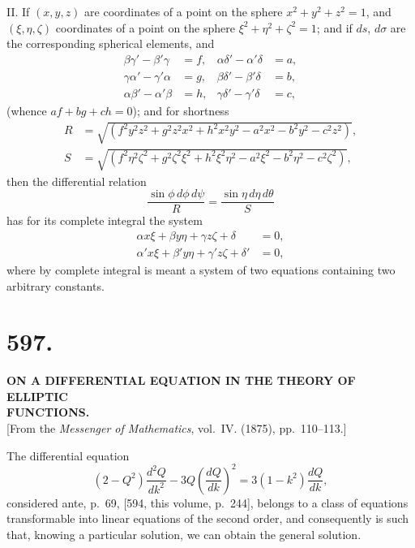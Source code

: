 \documentclass[11pt,a4paper]{book}
\begin{document}
\medskip
\noindent\textsc{II.}\quad
If $(x,y,z)$ are coordinates of a point on the sphere $x^2+y^2+z^2=1$, and
$(\xi,\eta,\zeta)$ coordinates of a point on the sphere
$\xi^2+\eta^2+\zeta^2=1$; and if $ds$, $d\sigma$ are the corresponding
spherical elements, and
\begin{align*}
\beta\gamma'-\beta'\gamma &= f, & \alpha\delta'-\alpha'\delta &= a, \\
\gamma\alpha'-\gamma'\alpha &= g, & \beta\delta'-\beta'\delta &= b, \\
\alpha\beta'-\alpha'\beta &= h, & \gamma\delta'-\gamma'\delta &= c,
\end{align*}
(whence $af+bg+ch=0$); and for shortness
\begin{align*}
R &= \sqrt{(f^2y^2z^2+g^2z^2x^2+h^2x^2y^2-a^2x^2-b^2y^2-c^2z^2)},\\
S &= \sqrt{(f^2\eta^2\zeta^2+g^2\zeta^2\xi^2+h^2\xi^2\eta^2
       -a^2\xi^2-b^2\eta^2-c^2\zeta^2)},
\end{align*}
then the differential relation
\[
\frac{\sin\phi\,d\phi\,d\psi}{R}
  = \frac{\sin\eta\,d\eta\,d\theta}{S}
\]
has for its complete integral the system
\begin{align*}
\alpha x\xi + \beta y\eta + \gamma z\zeta + \delta &= 0,\\
\alpha' x\xi + \beta' y\eta + \gamma' z\zeta + \delta' &= 0,
\end{align*}
where by complete integral is meant a system of two equations containing two
arbitrary constants.

\newpage
\section*{597.}
\begin{center}
{\large\bfseries ON A DIFFERENTIAL EQUATION IN THE THEORY OF ELLIPTIC\\
FUNCTIONS.}\\[0.5em]
[From the \textit{Messenger of Mathematics}, vol.~IV. (1875), pp.~110--113.]
\end{center}

The differential equation
\[
(2-Q^2)\frac{d^2Q}{dk^2} - 3Q\left(\frac{dQ}{dk}\right)^2
  = 3(1-k^2)\frac{dQ}{dk},
\]
considered ante, p.~69, [594, this volume, p.~244], belongs to a class of
equations transformable into linear equations of the second order, and
consequently is such that, knowing a particular solution, we can obtain the
general solution.
\end{document}
